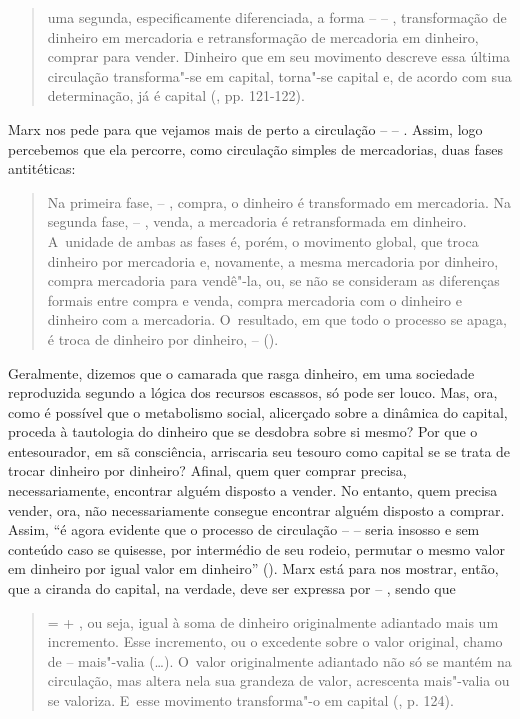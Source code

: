 \begin{quote}
uma segunda, especificamente diferenciada, a forma  --  -- ,
transformação de dinheiro em mercadoria e retransformação de mercadoria
em dinheiro, comprar para vender. Dinheiro que em seu movimento descreve
essa última circulação transforma"-se em capital, torna"-se capital e, de
acordo com sua determinação, já é capital (, pp. 121-122).
\end{quote}

Marx nos pede para que vejamos mais de perto a circulação  --  -- .
Assim, logo percebemos que ela percorre, como circulação simples de
mercadorias, duas fases antitéticas:

\begin{quote}
Na primeira fase,  -- , compra, o dinheiro é transformado em
mercadoria. Na segunda fase,  -- , venda, a mercadoria é
retransformada em dinheiro. A~unidade de ambas as fases é, porém, o
movimento global, que troca dinheiro por mercadoria e, novamente, a
mesma mercadoria por dinheiro, compra mercadoria para vendê"-la, ou, se
não se consideram as diferenças formais entre compra e venda, compra
mercadoria com o dinheiro e dinheiro com a mercadoria. O~resultado, em
que todo o processo se apaga, é troca de dinheiro por dinheiro,  -- 
().
\end{quote}

Geralmente, dizemos que o camarada que rasga dinheiro, em uma sociedade
reproduzida segundo a lógica dos recursos escassos, só pode ser louco.
Mas, ora, como é possível que o metabolismo social, alicerçado sobre a
dinâmica do capital, proceda à tautologia do dinheiro que se desdobra
sobre si mesmo? Por que o entesourador, em sã consciência, arriscaria
seu tesouro como capital se se trata de trocar dinheiro por dinheiro?
Afinal, quem quer comprar precisa, necessariamente, encontrar alguém
disposto a vender. No entanto, quem precisa vender, ora, não
necessariamente consegue encontrar alguém disposto a comprar. Assim, ``é
agora evidente que o processo de circulação  --  --  seria insosso e
sem conteúdo caso se quisesse, por intermédio de seu rodeio, permutar o
mesmo valor em dinheiro por igual valor em dinheiro'' (). Marx
está para nos mostrar, então, que a ciranda do capital, na verdade, deve
ser expressa por  -- , sendo que

\begin{quote}
 =  + , ou seja, igual à soma de dinheiro originalmente adiantado
mais um incremento. Esse incremento, ou o excedente sobre o valor
original, chamo de -- mais"-valia (\ldots{}). O~valor originalmente
adiantado não só se mantém na circulação, mas altera nela sua grandeza
de valor, acrescenta mais"-valia ou se valoriza. E~esse movimento
transforma"-o em capital (, p. 124).
\end{quote}

